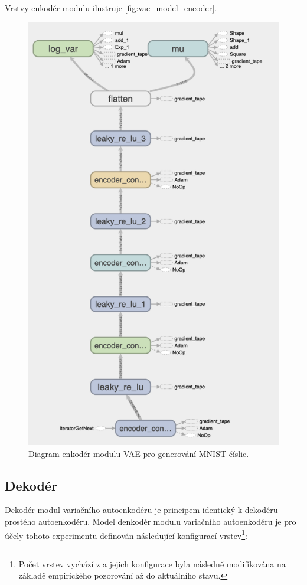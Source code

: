 Vrstvy enkodér modulu ilustruje \autoref{fig:vae_model_encoder}.
\begin{figure}[H]
    \centering
    \includegraphics[height=0.63\textheight]{figures/vae_model_encoder.png}
    \caption{Diagram enkodér modulu VAE pro generování MNIST číslic.}
    \label{fig:vae_model_encoder}
\end{figure}

\subsection{Dekodér}
Dekodér modul variačního autoenkodéru je principem identický k dekodéru prostého autoenkodéru.
Model denkodér modulu variačního autoenkodéru je pro účely tohoto experimentu definován následující konfigurací vrstev\footnote{Počet vrstev vychází z \textcite{Kingma2014} a jejich konfigurace byla následně modifikována na základě empirického pozorování až do aktuálního stavu.}:


